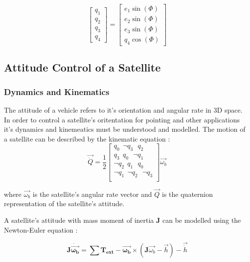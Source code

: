 \begin{equation}
    \begin{bmatrix}
        q_{1} \\ q_{2} \\ q_{3} \\ q_{4}
    \end{bmatrix}
    =
    \begin{bmatrix}
        e_{1}\sin(\Phi) \\ e_{2}\sin(\Phi) \\ e_{3}\sin(\Phi) \\ q_{4}\cos(\Phi)
    \end{bmatrix}
\end{equation}



\subsection{Attitude Control of a Satellite}
\subsubsection{Dynamics and Kinematics}
The attitude of a vehicle refers to it's orientation and angular rate in 3D space. In order to control a satellite's oritentation for pointing and other applications it's dynamics and kinemeatics must be understood and modelled. The motion of a satellite can be described by the kinematic equation \cite{sidiAttitudeDynamicsKinematics1997}:
\begin{equation}
    \vec{\dot{Q}}
=\frac{1}{2}
\begin{bmatrix}
q_{0} \ \ \neg q_{3} \ \ \ q_{2} \\ 
q_{3} \ \ q_{0} \ \ \ \neg q_{1} \\ 
\neg q_{2} \ \ q_{1} \ \ \ q_{0} \\ 
\neg q_{1} \ \ \neg q_{2} \ \ \ \neg q_{3} \\
\end{bmatrix} \vec{\omega_{b}}
\end{equation}

where $\vec{\omega_{b}}$ is the satellite's angular rate vector and $\vec{Q}$ is the quaternion representation of the satellite's attitude. 

A satellite's attitude with mass moment of inertia $\boldsymbol{J}$ can be modelled using the Newton-Euler equation \cite{sidiAttitudeDynamicsKinematics1997}: 

\begin{equation}
\mathbf{J}\mathbf{\dot{\vec{\omega_{b}}}} = \sum{\mathbf{T_{ext}}} -\mathbf{\vec{\omega_{b}}}\times(\mathbf{J}\vec{\omega_{b}}-\vec{h})-\vec{\dot{h}}
\end{equation}

